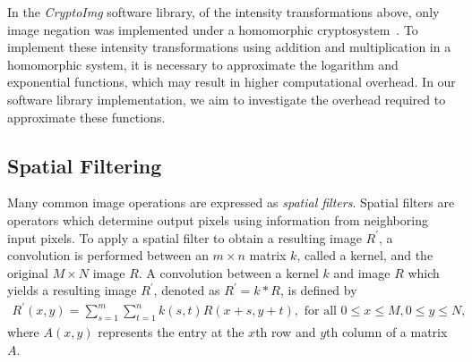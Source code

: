 In the \textit{CryptoImg} software library, of the intensity transformations above, only image negation was implemented under a homomorphic cryptosystem~\cite{ziad_cryptoimg:_2016}. To implement these intensity transformations using addition and multiplication in a homomorphic system, it is necessary to approximate the logarithm and exponential functions, which may result in higher computational overhead. In our software library implementation, we aim to investigate the overhead required to approximate these functions.

\subsection{Spatial Filtering}
Many common image operations are expressed as \textit{spatial filters}. Spatial filters are operators which determine output pixels using information from neighboring input pixels. To apply a spatial filter to obtain a resulting image $R^\prime$, a convolution is performed between an $m \times n$ matrix $k$, called a kernel, and the original $M\times N$ image $R$.
A convolution between a kernel $k$ and image $R$ which yields a resulting image $R^\prime$, denoted as $R^\prime = k \ast R$, is defined by
\begin{align} \label{eq:spatialfilter}
	R^\prime(x,y) = \sum_{s=1}^m{\sum_{t=1}^n{k(s,t)R(x+s,y+t)}}, \text{ for all } 0\leq x \leq M, 0 \leq y \leq N,
\end{align}
where $A(x,y)$ represents the entry at the $x$th row and $y$th column of a matrix $A$.

